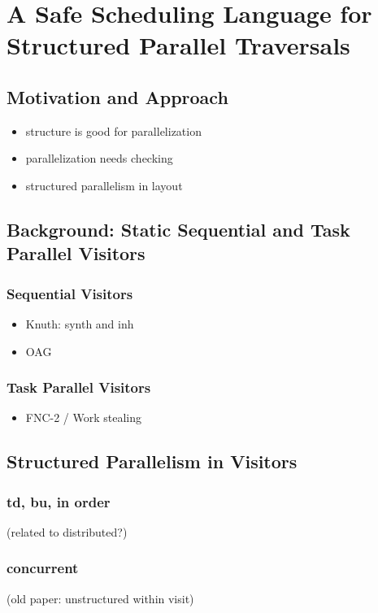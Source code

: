 \chapter{A Safe Scheduling Language for Structured Parallel Traversals}

\section{Motivation and Approach}
\begin{itemize}
\item structure is good for parallelization
\item parallelization needs checking
\item structured parallelism in layout 
\end{itemize}



\section{Background:  Static Sequential and Task Parallel Visitors}
\subsection{Sequential Visitors}  
\begin{itemize}
\item Knuth: synth and inh
\item OAG
\end{itemize}
\subsection{Task Parallel Visitors} 
\begin{itemize}
\item FNC-2 / Work stealing
\end{itemize}

\section{Structured Parallelism in Visitors} 
\subsection{td, bu, in order} (related to distributed?)
\subsection{concurrent} (old paper: unstructured within visit)

